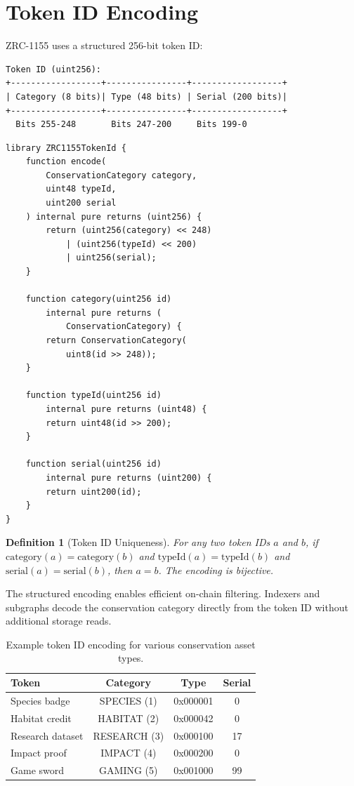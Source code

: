 \documentclass[11pt,letterpaper]{article}
\newtheorem{definition}{Definition}[section]
\begin{document}
\section{Token ID Encoding}
\label{sec:encoding}

ZRC-1155 uses a structured 256-bit token ID:

\begin{verbatim}
Token ID (uint256):
+------------------+----------------+------------------+
| Category (8 bits)| Type (48 bits) | Serial (200 bits)|
+------------------+----------------+------------------+
  Bits 255-248       Bits 247-200     Bits 199-0
\end{verbatim}

\begin{lstlisting}[language=Solidity,caption=ZRC1155TokenId library]
library ZRC1155TokenId {
    function encode(
        ConservationCategory category,
        uint48 typeId,
        uint200 serial
    ) internal pure returns (uint256) {
        return (uint256(category) << 248)
            | (uint256(typeId) << 200)
            | uint256(serial);
    }

    function category(uint256 id)
        internal pure returns (
            ConservationCategory) {
        return ConservationCategory(
            uint8(id >> 248));
    }

    function typeId(uint256 id)
        internal pure returns (uint48) {
        return uint48(id >> 200);
    }

    function serial(uint256 id)
        internal pure returns (uint200) {
        return uint200(id);
    }
}
\end{lstlisting}

\begin{definition}[Token ID Uniqueness]
For any two token IDs $a$ and $b$, if $\text{category}(a) = \text{category}(b)$ and $\text{typeId}(a) = \text{typeId}(b)$ and $\text{serial}(a) = \text{serial}(b)$, then $a = b$. The encoding is bijective.
\end{definition}

The structured encoding enables efficient on-chain filtering. Indexers and subgraphs decode the conservation category directly from the token ID without additional storage reads.

\begin{table}[t]
\centering
\begin{tabular}{lccc}
\toprule
\textbf{Token} & \textbf{Category} & \textbf{Type} & \textbf{Serial} \\
\midrule
Species badge & SPECIES (1) & 0x000001 & 0 \\
Habitat credit & HABITAT (2) & 0x000042 & 0 \\
Research dataset & RESEARCH (3) & 0x000100 & 17 \\
Impact proof & IMPACT (4) & 0x000200 & 0 \\
Game sword & GAMING (5) & 0x001000 & 99 \\
\bottomrule
\end{tabular}
\caption{Example token ID encoding for various conservation asset types.}
\label{tab:encoding}
\end{table}
\end{document}
